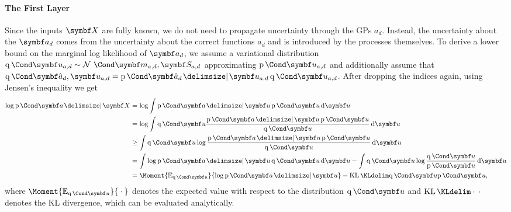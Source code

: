 \paragraph{The First Layer}
\label{toc:var_compression:first_layer}
Since the inputs $\mat{X}$ are fully known, we do not need to propagate uncertainty through the GPs $a_d$.
Instead, the uncertainty about the $\rv{a_d}$ comes from the uncertainty about the correct functions $a_d$ and is introduced by the processes themselves.
To derive a lower bound on the marginal log likelihood of $\rv{a_d}$, we assume a variational distribution $\Variat{\rv{u_{a, d}}} \sim \Gaussian{\mat{m_{a, d}}, \mat{S_{a, d}}}$ approximating $\Prob{\rv{u_{a, d}}}$ and additionally assume that $\Variat{\rv{\hat{a}_d}, \rv{u_{a, d}}} = \Prob{\rv{\hat{a}_d} \given \rv{u_{a, d}}}\Variat{\rv{u_{a, d}}}$.
After dropping the indices again, using Jensen's inequality we get
\begin{align}
    \label{eq:var_compression:svgp_log_likelihood}
    \begin{split}
        \log \Prob{\rv{a} \given \mat{X}} &= \log \int \Prob{\rv{a} \given \rv{u}} \Prob{\rv{u}} \diff \rv{u} \\
        &= \log \int \Variat{\rv{u}} \frac{\Prob{\rv{a} \given \rv{u}} \Prob{\rv{u}}}{\Variat{\rv{u}}} \diff \rv{u} \\
        &\geq \int \Variat{\rv{u}} \log \frac{\Prob{\rv{a} \given \rv{u}} \Prob{\rv{u}}}{\Variat{\rv{u}}} \diff \rv{u} \\
        &= \int \log \Prob{\rv{a} \given \rv{u}} \Variat{\rv{u}} \diff \rv{u} - \int \Variat{\rv{u}} \log \frac{\Variat{\rv{u}}}{\Prob{\rv{u}}} \diff \rv{u} \\
        &= \Moment{\E_{\Variat{\rv{u}}}}{\log \Prob{\rv{a} \given \rv{u}}} - \KL{\Variat{\rv{u}}}{\Prob{\rv{u}}},
    \end{split}
\end{align}
where $\Moment{\E_{\Variat{\rv{u}}}}{{}\cdot{}}$ denotes the expected value with respect to the distribution $\Variat{\rv{u}}$ and $\KL{{}\cdot{}}{{}\cdot{}}$ denotes the KL divergence, which can be evaluated analytically.

